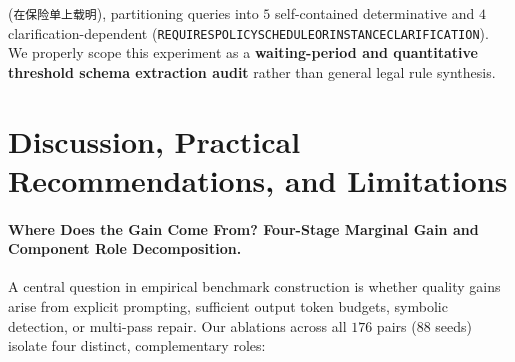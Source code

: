\documentclass[10pt,twocolumn]{article}
\renewcommand{\_}{\textunderscore\allowbreak}
\begin{document}
\begin{enumerate}[leftmargin=*,nosep]
(\texttt{在保险单上载明}), partitioning queries into $5$ self-contained determinative and $4$ clarification-dependent (\texttt{REQUIRES\_POLICY\_SCHEDULE\_OR\_INSTANCE\_CLARIFICATION}). We properly scope this experiment as a \textbf{waiting-period and quantitative threshold schema extraction audit} rather than general legal rule synthesis.
\end{enumerate}

\section{Discussion, Practical Recommendations, and Limitations}
\paragraph{Where Does the Gain Come From? Four-Stage Marginal Gain and Component Role Decomposition.}
A central question in empirical benchmark construction is whether quality gains arise from explicit prompting, sufficient output token budgets, symbolic detection, or multi-pass repair. Our ablations across all $176$ pairs ($88$ seeds) isolate four distinct, complementary roles:
\end{document}

